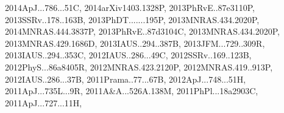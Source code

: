 \documentclass[12pt]{article}
\begin{document}
\begin{enumerate}
\begin{enumerate}
{2014ApJ...786...51C,%
2014arXiv1403.1328P,%
2013PhRvE..87e3110P,%
2013SSRv..178..163B,%
2013PhDT.......195P,%
2013MNRAS.434.2020P,%
2014MNRAS.444.3837P,%
2013PhRvE..87d3104C,%
2013MNRAS.434.2020P,%
2013MNRAS.429.1686D,%
2013IAUS..294..387B,%
2013JFM...729..309R,%
2013IAUS..294..353C,%
2012IAUS..286...49C,%
2012SSRv..169..123B,%
2012PhyS...86a8405R,%
2012MNRAS.423.2120P,%
2012MNRAS.419..913P,%
2012IAUS..286...37B,%
2011Prama..77...67B,%
2012ApJ...748...51H,%
2011ApJ...735L...9R,%
2011A&A...526A.138M,%
2011PhPl...18a2903C,%
2011ApJ...727...11H,%
}
\end{enumerate}
\end{enumerate}
\end{document}
